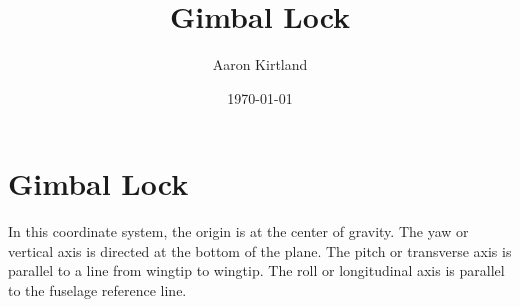 \documentclass[12pt,letterpaper,titlepage,twoside]{article}
\begin{document}
\title{Gimbal Lock}
\author{Aaron Kirtland}
\date{\today}
\titlepage{}
\tableofcontents

\section{Gimbal Lock}

\begin{definition}
  In this coordinate system, the origin is at the center of gravity.
  The yaw or vertical axis is directed at the bottom of the plane.
  The pitch or transverse axis is parallel to a line from wingtip to wingtip.
  The roll or longitudinal axis is parallel to the fuselage reference line.
\end{definition}


\begin{definition}[SO(3)]
\end{definition}
\end{document}
